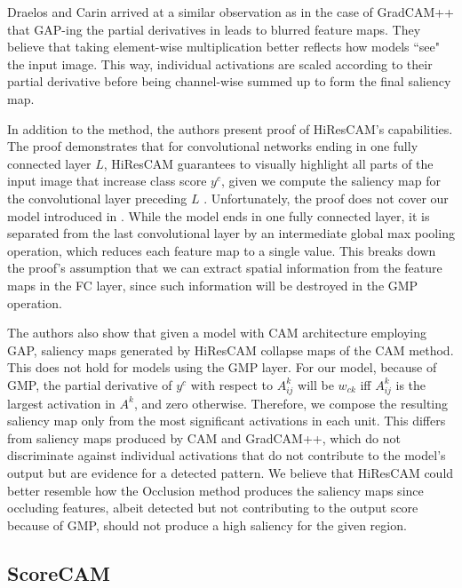 Draelos and Carin \cite{hires-cam} arrived at a similar observation as in the case of GradCAM++ that GAP-ing the partial derivatives in  leads to blurred feature maps. 
They believe that taking element-wise multiplication better reflects how models ``see" the input image.
This way, individual activations are scaled according to their partial derivative before being channel-wise summed up to form the final saliency map.

In addition to the method, the authors present proof of HiResCAM's capabilities.
The proof demonstrates that for convolutional networks ending in one fully connected layer $L$, HiResCAM guarantees to visually highlight all parts of the input image that increase class score $y^c$, given we compute the saliency map for the convolutional layer preceding $L$ \cite{hires-cam}.
Unfortunately, the proof does not cover our model introduced in .
While the model ends in one fully connected layer, it is separated from the last convolutional layer by an intermediate global max pooling operation, which reduces each feature map to a single value.
This breaks down the proof's assumption that we can extract spatial information from the feature maps in the FC layer, since such information will be destroyed in the GMP operation. 

The authors also show that given a model with CAM architecture employing GAP, saliency maps generated by HiResCAM collapse maps of the CAM method.
This does not hold for models using the GMP layer.
For our model, because of GMP, the partial derivative of $y^c$ with respect to $A^k_{ij}$ will be $w_{ck}$ iff $A^k_{ij}$ is the largest activation in $A^k$, and zero otherwise.
Therefore, we compose the resulting saliency map only from the most significant activations in each unit.
This differs from saliency maps produced by CAM and GradCAM++, which do not discriminate against individual activations that do not contribute to the model's output but are evidence for a detected pattern.
We believe that HiResCAM could better resemble how the Occlusion method produces the saliency maps since occluding features, albeit detected but not contributing to the output score because of GMP, should not produce a high saliency for the given region.

\subsection{ScoreCAM}


